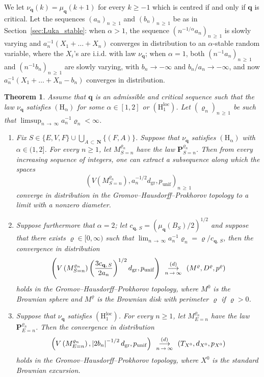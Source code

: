 \documentclass[10pt]{amsart}
\newtheorem{theo}{Theorem}[section]
\theoremstyle{definition}\newtheorem{defi}[theo]{Definition}\newtheorem{rema}[theo]{Remark}\newtheorem{exam}[theo]{Example}\newtheorem{exem}[theo]{Example}\newtheorem{nota}[theo]{Notation}
\newcommand{\ensembles}[1]{\mathbf{#1}}
\newcommand{\N}{\ensembles{N}}
\renewcommand{\P}{\ensembles{P}}
\newcommand{\1}{\ensembles{1}}
\newcommand{\q}{\mathbf{q}}
\renewcommand{\ge}{\geqslant}
\newcommand{\Bmap}{M}
\newcommand{\dBmap}{D}
\newcommand{\pBmap}{p}
\newcommand{\CRT}{T}
\newcommand{\dCRT}{d}
\newcommand{\pCRT}{p}
\newcommand{\Hrmloc}{\mathrm{(H_1^{loc})}}
\newcommand{\Hrmalp}{\mathrm{(H_\alpha)}}
\newcommand{\dgr}{d_{\mathrm{gr}}}
\newcommand{\pgr}{p_{\mathrm{unif}}}
\newcommand{\cvloi}[1][n]{\enskip\mathop{\longrightarrow}^{(d)}_{#1\,\to\, \infty}\enskip}
\providecommand{\?}{}
\begin{document}
We let $\nu_\q(k) = \mu_\q(k+1)$ for every $k \ge -1$ which is centred if and only if $\q$ is critical. Let the sequences $(a_n)_{n\,\ge\,1}$ and $(b_n)_{n\,\ge\,1}$ be as in Section~\ref{sec:Luka_stable}: when $\alpha>1$, the sequence $(n^{-1/\alpha} a_n)_{n\,\ge\,1}$ is slowly varying and $a_n^{-1} (X_1 + \dots + X_n)$ converges in distribution to an $\alpha$-stable random variable, where the $X_i$'s are i.i.d. with law $\nu_\q$; when $\alpha=1$, both $(n^{-1} a_n)_{n\,\ge\,1}$ and $(n^{-1} b_n)_{n\,\ge\,1}$ are slowly varying, with $b_n \to -\infty$ and $b_n / a_n \to -\infty$, and now $a_n^{-1} (X_1 + \dots + X_n - b_n)$ converges in distribution.



\begin{theo}\label{thm:Boltzmann}
Assume that $\q$ is an admissible and critical sequence such that the law $\nu_\q$ satisfies $\Hrmalp$ for some $\alpha \in [1, 2]$ or $\Hrmloc$. Let $(\varrho_n)_{n\,\ge\,1}$ be such that $\limsup_{n\,\to\,\infty} a_n^{-1} \varrho_n < \infty$.
\begin{enumerate}
\item\label{thm:Boltzmann_stable}
Fix $S \in \{E, V, F\} \cup \bigcup_{A\,\subset\,\N} \{(F,A)\}$. Suppose that $\nu_\q$ satisfies $\Hrmalp$ with $\alpha \in (1, 2]$. For every $n \ge 1$, let $M^{\varrho_n}_{S=n}$ have the law $\P^{\varrho_n}_{S=n}$. Then from every increasing sequence of integers, one can extract a subsequence along which the spaces
\[
\left(V\left(M^{\varrho_n}_{S=n}\right), a_n^{-1/2} \dgr, \pgr\right)_{n\,\ge\,1}
\]
converge in distribution in the Gromov--Hausdorff--Prokhorov topology to a limit with a nonzero diameter.

\item\label{thm:Boltzmann_Gaussien}
Suppose furthermore that $\alpha = 2$; let $c_{\q,\,S} = (\mu_\q(B_S) / 2)^{1/2}$ and suppose that there exists $\varrho \in [0, \infty)$ such that $\lim_{n\,\to\,\infty} a_n^{-1} \varrho_n = \varrho / c_{\q,\,S}$, then the convergence in distribution
\[
\left(V\left(M^{\varrho_n}_{S=n}\right) \left(\frac{3 c_{\q,\,S}}{2 a_n}\right)^{1/2} \dgr, \pgr\right) \cvloi \left(\Bmap^\varrho, \dBmap^\varrho, \pBmap^\varrho\right)
\]
holds in the Gromov--Hausdorff--Prokhorov topology, where $\Bmap^0$ is the Brownian sphere and $\Bmap^\varrho$ is the Brownian disk with perimeter $\varrho$ if $\varrho>0$.


\item\label{thm:Boltzmann_Cauchy_loc}
Suppose that $\nu_\q$ satisfies $\Hrmloc$. For every $n \ge 1$, let $M^{\varrho_n}_{E=n}$ have the law $\P^{\varrho_n}_{E=n}$. Then the convergence in distribution
\[
\left(V\left(M^{\varrho_n}_{E=n}\right), \left|2b_n\right|^{-1/2} \dgr, \pgr\right) \cvloi \left(\CRT_{X^0}, \dCRT_{X^0}, \pCRT_{X^0}\right)
\]
holds in the Gromov--Hausdorff--Prokhorov topology, where $X^0$ is the standard Brownian excursion.


\end{enumerate}
\end{theo}
\end{document}
